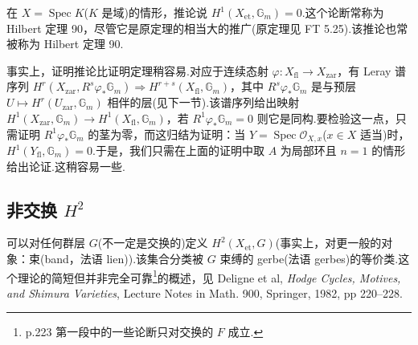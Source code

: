 在 $X = \operatorname{Spec} K$($K$ 是域)的情形，推论说 $H^{1}(X_{\mathrm{et}}, \mathbb{G}_{m}) = 0$.这个论断常称为 Hilbert 定理 90，尽管它是原定理的相当大的推广(原定理见 FT 5.25).该推论也常被称为 Hilbert 定理 90.

\begin{remark}\label{rem:11.7}
事实上，证明推论比证明定理稍容易.对应于连续态射 $\varphi \colon X_{\mathrm{fl}} \to X_{\mathrm{zar}}$，有 Leray 谱序列 $H^{r}(X_{\mathrm{zar}}, R^{s}\varphi_{*}\mathbb{G}_{m}) \Rightarrow H^{r+s}(X_{\mathrm{fl}}, \mathbb{G}_{m})$，其中 $R^{s}\varphi_{*}\mathbb{G}_{m}$ 是与预层 $U \mapsto H^{r}(U_{\mathrm{zar}}, \mathbb{G}_{m})$ 相伴的层(见下一节).该谱序列给出映射 $H^{1}(X_{\mathrm{zar}}, \mathbb{G}_{m}) \to H^{1}(X_{\mathrm{fl}}, \mathbb{G}_{m})$，若 $R^{1}\varphi_{*}\mathbb{G}_{m} = 0$ 则它是同构.要检验这一点，只需证明 $R^{1}\varphi_{*}\mathbb{G}_{m}$ 的茎为零，而这归结为证明：当 $Y = \operatorname{Spec} \mathcal{O}_{X, x}$($x \in X$ 适当)时，$H^{1}(Y_{\mathrm{fl}}, \mathbb{G}_{m}) = 0$.于是，我们只需在上面的证明中取 $A$ 为局部环且 $n = 1$ 的情形给出论证.这稍容易一些.
\end{remark}

\subsection*{\texorpdfstring{非交换 $H^{2}$}{非交换 H2}}

可以对任何群层 $G$(不一定是交换的)定义 $H^{2}(X_{\mathrm{et}}, G)$(事实上，对更一般的对象：束(band，法语 lien)).该集合分类被 $G$ 束缚的 gerbe(法语 gerbes)的等价类.这个理论的简短但并非完全可靠\footnote{p.223 第一段中的一些论断只对交换的 $F$ 成立.}的概述，见 Deligne et al, \emph{Hodge Cycles, Motives, and Shimura Varieties}, Lecture Notes in Math. 900, Springer, 1982, pp 220--228.

